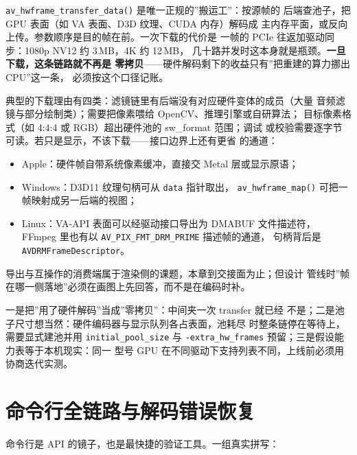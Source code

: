 \documentclass[12pt,a4paper,fontset=fandol]{ctexbook}
\newcommand{\Fn}[1]{\texttt{#1()}}
\newcommand{\Tp}[1]{\texttt{#1}}
\begin{document}
\Fn{av\_hwframe\_transfer\_data} 是唯一正规的''搬运工''：按源帧的
后端查池子，把 GPU 表面（如 VA 表面、D3D 纹理、CUDA 内存）解码成
主内存平面，或反向上传。参数顺序是目的帧在前。一次下载的代价是
一帧的 PCIe 往返加驱动同步：1080p NV12 约 3\,MB，4K 约 12\,MB，
几十路并发时这本身就是瓶颈。\textbf{一旦下载，这条链路就不再是
零拷贝}——硬件解码剩下的收益只有''把重建的算力挪出 CPU''这一条，
必须按这个口径记账。

典型的下载理由有四类：滤镜链里有后端没有对应硬件变体的成员（大量
音频滤镜与部分绘制类）；需要把像素喂给 OpenCV、推理引擎或自研算法；
目标像素格式（如 4:4:4 或 RGB）超出硬件池的 sw\_format 范围；调试
或校验需要逐字节可读。若只是显示，不该下载——接口边界上还有更省
的通道：

\begin{itemize}
  \item Apple：硬件帧自带系统像素缓冲，直接交 Metal 层或显示原语；
  \item Windows：D3D11 纹理句柄可从 \Tp{data} 指针取出，
        \Fn{av\_hwframe\_map} 可把一帧映射成另一后端的视图；
  \item Linux：VA-API 表面可以经驱动接口导出为 DMABUF 文件描述符，
        FFmpeg 里也有以 \Tp{AV\_PIX\_FMT\_DRM\_PRIME} 描述帧的通道，
        句柄背后是 \Tp{AVDRMFrameDescriptor}。
\end{itemize}

导出与互操作的消费端属于渲染侧的课题，本章到交接面为止；但设计
管线时''帧在哪一侧落地''必须在画图上先回答，而不是在编码时补。

\begin{warning}[title={硬件解码的三个高频误区}]
  一是把''用了硬件解码''当成''零拷贝''：中间夹一次 transfer 就已经
  不是；二是池子尺寸想当然：硬件编码器与显示队列各占表面，池耗尽
  时整条链停在等待上，需要显式建池并用 \Tp{initial\_pool\_size} 与
  \Tp{-extra\_hw\_frames} 预留；三是假设能力表等于本机现实：同一
  型号 GPU 在不同驱动下支持列表不同，上线前必须用协商迭代实测。
\end{warning}

\section{命令行全链路与解码错误恢复}

命令行是 API 的镜子，也是最快捷的验证工具。一组真实拼写：
\end{document}
